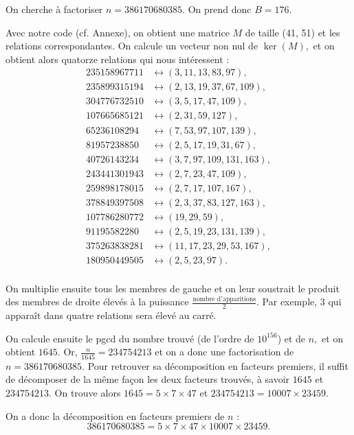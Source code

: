 \documentclass[french, 12pt, titlepage]{article}
\begin{document}
On cherche à factoriser $n = 386170680385.$ On prend donc $B = 176.$

Avec notre code (cf. Annexe), on obtient une matrice $M$ de taille (41, 51) et les relations correspondantes. On calcule un vecteur non nul de $\ker(M),$ et on obtient alors quatorze relations qui nous intéressent :
\begin{alignat*}{2}
35158967711 & \leftrightarrow (3, 11, 13, 83, 97), \\
235899315194 & \leftrightarrow (2, 13, 19, 37, 67, 109), \\
304776732510 & \leftrightarrow (3, 5, 17, 47, 109), \\
107665685121 & \leftrightarrow (2, 31, 59, 127), \\
65236108294 & \leftrightarrow (7, 53, 97, 107, 139), \\
81957238850 & \leftrightarrow (2, 5, 17, 19, 31, 67), \\
40726143234 & \leftrightarrow (3, 7, 97, 109, 131, 163), \\
243441301943 & \leftrightarrow (2, 7, 23, 47, 109), \\
259898178015 & \leftrightarrow (2, 7, 17, 107, 167), \\
378849397508 & \leftrightarrow (2, 3, 37, 83, 127, 163), \\
107786280772 & \leftrightarrow (19, 29, 59), \\
91195582280 & \leftrightarrow (2, 5, 19, 23, 131, 139), \\
375263838281 & \leftrightarrow (11, 17, 23, 29, 53, 167), \\
180950449505 & \leftrightarrow (2, 5, 23, 97). \\
\end{alignat*}

On multiplie ensuite tous les membres de gauche et on leur soustrait le produit des membres de droite élevés à la puissance $\frac{\text{nombre d'apparitions}}{2}.$
Par exemple, $3$ qui apparaît dans quatre relations sera élevé au carré.

On calcule ensuite le pgcd du nombre trouvé (de l'ordre de $10^{156}$) et de $n,$ et on obtient $1645.$ 
Or, $\frac{n}{1645} = 234754213$ et on a donc une factorisation de $n = 386170680385.$
Pour retrouver sa décomposition en facteurs premiers, il suffit de décomposer de la même façon les deux facteurs trouvés, à savoir $1645$ et $234754213.$
On trouve alors $1645 = 5 \times 7 \times 47$ et $234754213 = 10007 \times 23459.$

On a donc la décomposition en facteurs premiers de $n$ :
\[386170680385 = 5 \times 7 \times 47 \times 10007 \times 23459.\]
\end{document}

